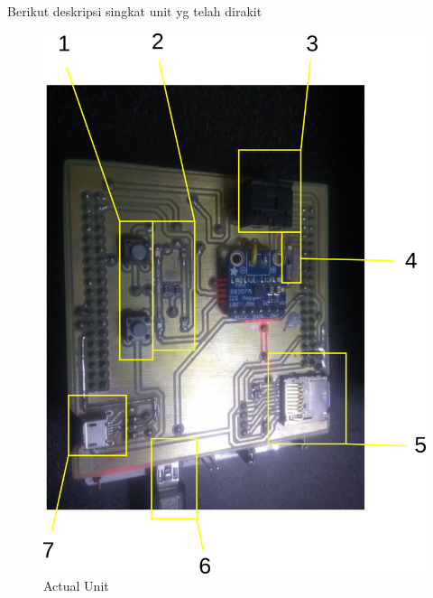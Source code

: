 \documentclass[12pt,]{article}
\begin{document}
	Berikut deskripsi singkat unit yg telah dirakit
	\begin{figure}[!ht]
		\centering
		\includegraphics[width=400pt]{images/completed}
		\caption{Actual Unit}
	\end{figure}
\end{document}
